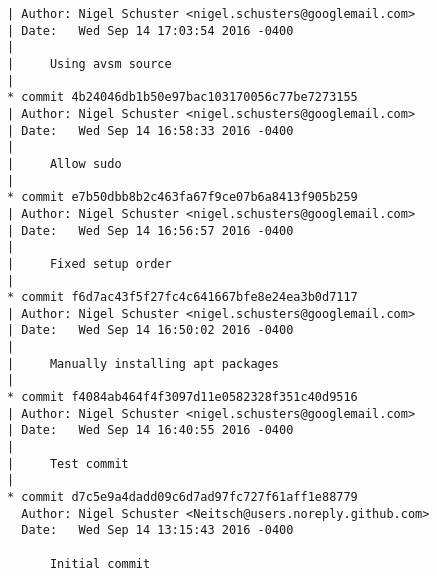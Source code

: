 \begin{lstlisting}
| Author: Nigel Schuster <nigel.schusters@googlemail.com>
| Date:   Wed Sep 14 17:03:54 2016 -0400
| 
|     Using avsm source
|  
* commit 4b24046db1b50e97bac103170056c77be7273155
| Author: Nigel Schuster <nigel.schusters@googlemail.com>
| Date:   Wed Sep 14 16:58:33 2016 -0400
| 
|     Allow sudo
|  
* commit e7b50dbb8b2c463fa67f9ce07b6a8413f905b259
| Author: Nigel Schuster <nigel.schusters@googlemail.com>
| Date:   Wed Sep 14 16:56:57 2016 -0400
| 
|     Fixed setup order
|  
* commit f6d7ac43f5f27fc4c641667bfe8e24ea3b0d7117
| Author: Nigel Schuster <nigel.schusters@googlemail.com>
| Date:   Wed Sep 14 16:50:02 2016 -0400
| 
|     Manually installing apt packages
|  
* commit f4084ab464f4f3097d11e0582328f351c40d9516
| Author: Nigel Schuster <nigel.schusters@googlemail.com>
| Date:   Wed Sep 14 16:40:55 2016 -0400
| 
|     Test commit
|  
* commit d7c5e9a4dadd09c6d7ad97fc727f61aff1e88779
  Author: Nigel Schuster <Neitsch@users.noreply.github.com>
  Date:   Wed Sep 14 13:15:43 2016 -0400
  
      Initial commit


\end{lstlisting}
